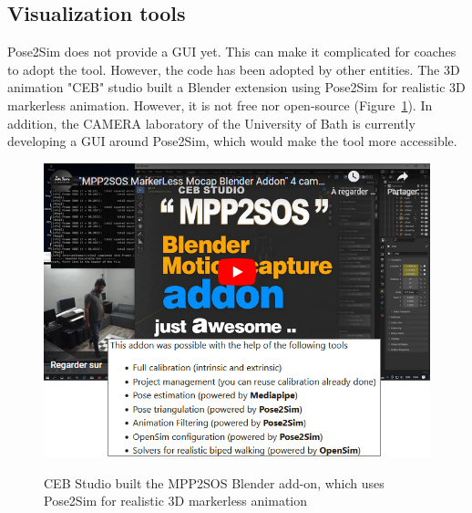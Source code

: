 \subsection{Visualization tools}\label{subsec:viztools}

Pose2Sim does not provide a GUI yet. This can make it complicated for coaches to adopt the tool. However, the code has been adopted by other entities. The 3D animation "CEB" studio built a Blender \cite{Blender1998} extension using Pose2Sim for realistic 3D markerless animation. However, it is not free nor open-source \cite{Barreto2022} (Figure~\ref{fig_mpp2sos}). In addition, the CAMERA laboratory of the University of Bath is currently developing a GUI around Pose2Sim, which would make the tool more accessible. 

\begin{figure}[hbtp]
      \centering
      \def\svgwidth{1\columnwidth}
      \fontsize{10pt}{10pt}\selectfont
      \href{https://blendermarket.com/products/mocap-mpp2soss}{
            \includegraphics[width=0.93\linewidth]{"../Chap3/Figures/Fig_MPP2SOS.png"}
      }
      \caption{CEB Studio built the MPP2SOS Blender add-on, which uses Pose2Sim for realistic 3D markerless animation}
      \label{fig_mpp2sos}
\end{figure}


